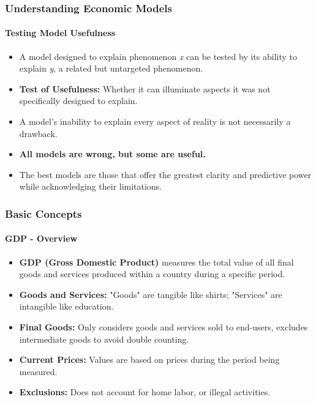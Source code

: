 \documentclass{beamer}
\begin{document}
        \begin{frame}
            \frametitle{Understanding Economic Models}
            \framesubtitle{Testing Model Usefulness}
                \begin{itemize}
                    \item A model designed to explain phenomenon \textit{x} can be tested by its ability to explain \textit{y}, a related but untargeted phenomenon.
                    \item \textbf{Test of Usefulness:} Whether it can illuminate aspects it was not specifically designed to explain.
                    \item A model's inability to explain every aspect of reality is not necessarily a drawback.
                    \item \textbf{ All models are wrong, but some are useful.}
                    \item The best models are those that offer the greatest clarity and predictive power while acknowledging their limitations.
                    \end{itemize}
                \end{frame}
\begin{frame}
    \frametitle{Basic Concepts}
    \framesubtitle{GDP - Overview}
        \begin{itemize}
            \item \textbf{GDP (Gross Domestic Product)} measures the total value of all final goods and services produced within a country during a specific period.
            \item \textbf{Goods and Services:} "Goods" are tangible like shirts; "Services" are intangible like education.
            \item \textbf{Final Goods:} Only considers goods and services sold to end-users, excludes intermediate goods to avoid double counting.
            \item \textbf{Current Prices:} Values are based on prices during the period being measured.
            \item \textbf{Exclusions:} Does not account for home labor,  or illegal activities.
        \end{itemize}
    \end{frame}
    
\end{document}
